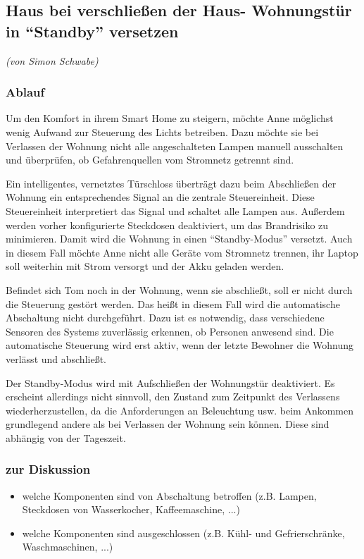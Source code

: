 \subsection{Haus bei verschließen der Haus- Wohnungstür in "`Standby"' versetzen}
\emph{(von Simon Schwabe)}
\subsubsection{Ablauf}
Um den Komfort in ihrem Smart Home zu steigern, möchte Anne möglichst wenig Aufwand zur Steuerung des Lichts betreiben. Dazu möchte sie bei Verlassen der Wohnung nicht alle angeschalteten Lampen manuell ausschalten und überprüfen, ob Gefahrenquellen vom Stromnetz getrennt sind.

Ein intelligentes, vernetztes Türschloss überträgt dazu beim Abschließen der Wohnung ein entsprechendes Signal an die zentrale Steuereinheit. Diese Steuereinheit interpretiert das Signal und schaltet alle Lampen aus. Außerdem werden vorher konfigurierte Steckdosen deaktiviert, um das Brandrisiko zu minimieren. Damit wird die Wohnung in einen "`Standby-Modus"' versetzt. Auch in diesem Fall möchte Anne nicht alle Geräte vom Stromnetz trennen, ihr Laptop soll weiterhin mit Strom versorgt und der Akku geladen werden.

Befindet sich Tom noch in der Wohnung, wenn sie abschließt, soll er nicht durch die Steuerung gestört werden. Das heißt in diesem Fall wird die automatische Abschaltung nicht durchgeführt. Dazu ist es notwendig, dass verschiedene Sensoren des Systems zuverlässig erkennen, ob Personen anwesend sind. Die automatische Steuerung wird erst aktiv, wenn der letzte Bewohner die Wohnung verlässt und abschließt.

Der Standby-Modus wird mit Aufschließen der Wohnungstür deaktiviert. Es erscheint allerdings nicht sinnvoll, den Zustand zum Zeitpunkt des Verlassens wiederherzustellen, da die Anforderungen an Beleuchtung usw. beim Ankommen grundlegend andere als bei Verlassen der Wohnung sein können. Diese sind abhängig von der Tageszeit.

\subsubsection{zur Diskussion}
\begin{itemize}
	\item welche Komponenten sind von Abschaltung betroffen (z.B. Lampen, Steckdosen von Wasserkocher, Kaffeemaschine, ...)
	\item welche Komponenten sind ausgeschlossen (z.B. Kühl- und Gefrierschränke, Waschmaschinen, ...)
\end{itemize}

